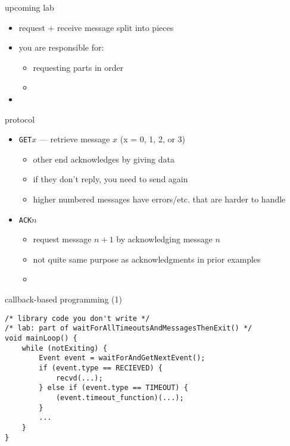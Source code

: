 \begin{frame}{upcoming lab}
    \begin{itemize}
    \item request + receive message split into pieces
    \item you are responsible for:
        \begin{itemize}
        \item requesting parts in order
        \item {}
        \end{itemize}
    \item {}
    \end{itemize}
\end{frame}

\begin{frame}{protocol}
    \begin{itemize}
    \item {\tt GET$x$} --- retrieve message $x$ (x = 0, 1, 2, or 3)
        \begin{itemize}
        \item other end acknowledges by giving data
        \item if they don't reply, you need to send again
        \item higher numbered messages have errors/etc. that are harder to handle
        \end{itemize}
    \item {\tt ACK$n$ }
        \begin{itemize}
        \item request message $n + 1$ by acknowledging message $n$
        \item not quite same purpose as acknowledgments in prior examples
        \item {} \\
        \end{itemize}
    \end{itemize}
\end{frame}


\begin{frame}[fragile]{callback-based programming (1)}
\begin{Verbatim}[fontsize=\small]
/* library code you don't write */
/* lab: part of waitForAllTimeoutsAndMessagesThenExit() */
void mainLoop() {
    while (notExiting) {
        Event event = waitForAndGetNextEvent();
        if (event.type == RECIEVED) {
            recvd(...);
        } else if (event.type == TIMEOUT) {
            (event.timeout_function)(...);
        }
        ...
    }
}
\end{Verbatim}
\end{frame}

